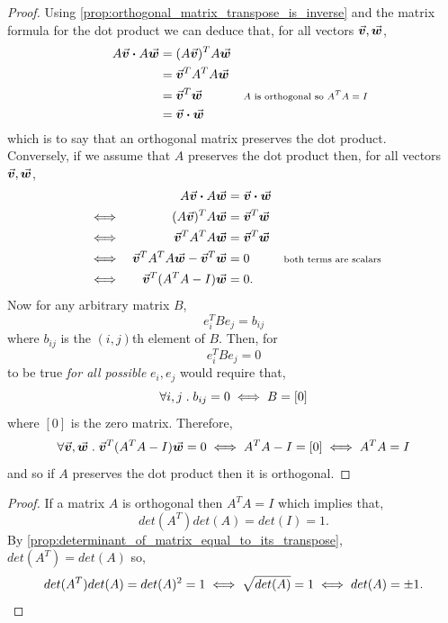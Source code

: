 \documentclass[MathsNotesBase.tex]{subfiles}
\begin{document}
{		\bigskip
		\begin{proof}
			Using \autoref{prop:orthogonal_matrix_transpose_is_inverse} and the matrix formula for the dot product we can deduce that, for all vectors ${ \vec{\bm{v}},\vec{\bm{w}} }$,
			\begin{align*}
			&& A\vec{\bm{v}} \boldsymbol{\cdot} A\vec{\bm{w}} &= (A\vec{\bm{v}})^T A\vec{\bm{w}} \\
			&&  &= \vec{\bm{v}}^TA^TA\vec{\bm{w}} &\text{\scriptsize{}} \\
			&&  &= \vec{\bm{v}}^T\vec{\bm{w}} &\text{\scriptsize{$A$ is orthogonal so ${A^TA = I}$}} \\
			&&  &= \vec{\bm{v}} \boldsymbol{\cdot} \vec{\bm{w}}
			\end{align*}
			which is to say that an orthogonal matrix preserves the dot product.\\
			
			Conversely, if we assume that $A$ preserves the dot product then, for all vectors ${ \vec{\bm{v}},\vec{\bm{w}} }$,
			\begin{align*}
			&& A\vec{\bm{v}} \boldsymbol{\cdot} A\vec{\bm{w}} &= \vec{\bm{v}} \boldsymbol{\cdot} \vec{\bm{w}}  \\
			&\iff & (A\vec{\bm{v}})^TA\vec{\bm{w}} &= \vec{\bm{v}}^T\vec{\bm{w}} & \\
			&\iff & \vec{\bm{v}}^TA^TA\vec{\bm{w}} &= \vec{\bm{v}}^T\vec{\bm{w}} & \\
			&\iff & \vec{\bm{v}}^TA^TA\vec{\bm{w}} - \vec{\bm{v}}^T\vec{\bm{w}} &= 0 & \text{\scriptsize{both terms are scalars}}\\
			&\iff & \vec{\bm{v}}^T(A^TA - I)\vec{\bm{w}} &= 0. &
			\end{align*}
			Now for any arbitrary matrix $B$, 
			\[ e_i^TBe_j = b_{ij} \]
			where $b_{ij}$ is the $(i,j)$th element of $B$. Then, for
			\[ e_i^TBe_j = 0 \]
			to be true \textit{for all possible} ${ e_i,e_j }$ would require that, 
			\[ \forall i,j \;.\; b_{ij} = 0 \iff B = [0] \]
			where $[0]$ is the zero matrix. Therefore,
			\[ \forall \vec{\bm{v}},\vec{\bm{w}} \;.\; \vec{\bm{v}}^T(A^TA - I)\vec{\bm{w}} = 0 \iff A^TA - I = [0] \iff A^TA = I \]
			and so if $A$ preserves the dot product then it is orthogonal.
		\end{proof}
	
	
		\bigskip
		\begin{proof}
			If a matrix $A$ is orthogonal then ${ A^TA = I }$ which implies that,
			\[ det(A^T)det(A) = det(I) = 1. \]
			By \autoref{prop:determinant_of_matrix_equal_to_its_transpose}, ${ det(A^T) = det(A) }$ so,
			\[ det(A^T)det(A) = det(A)^2 = 1 \iff \sqrt{det(A)} = 1 \iff det(A) = \pm 1.  \qedhere \]
		\end{proof}
	
}
\end{document}
